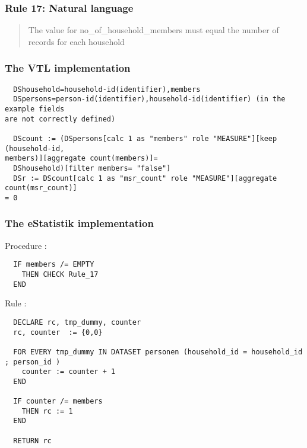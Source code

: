 \newpage

\subsubsection*{  Rule 17: Natural language}
\begin{quote}


The value for no\_of\_household\_members must equal the number of records for each household


\end{quote}
\subsubsection*{The VTL implementation}
\begin{verbatim}
  DShousehold=household-id(identifier),members
  DSpersons=person-id(identifier),household-id(identifier) (in the example fields
are not correctly defined)

  DScount := (DSpersons[calc 1 as "members" role "MEASURE"][keep (household-id,
members)][aggregate count(members)]=
  DShousehold)[filter members= "false"]
  DSr := DScount[calc 1 as "msr_count" role "MEASURE"][aggregate count(msr_count)]
= 0

\end{verbatim}
\subsubsection*{The eStatistik implementation}
\noindent
Procedure :
\begin{verbatim}
  IF members /= EMPTY
    THEN CHECK Rule_17
  END
\end{verbatim}
\noindent
Rule :
\begin{verbatim}
  DECLARE rc, tmp_dummy, counter
  rc, counter  := {0,0}

  FOR EVERY tmp_dummy IN DATASET personen (household_id = household_id ; person_id )
    counter := counter + 1
  END

  IF counter /= members
    THEN rc := 1
  END

  RETURN rc
\end{verbatim}

\newpage

